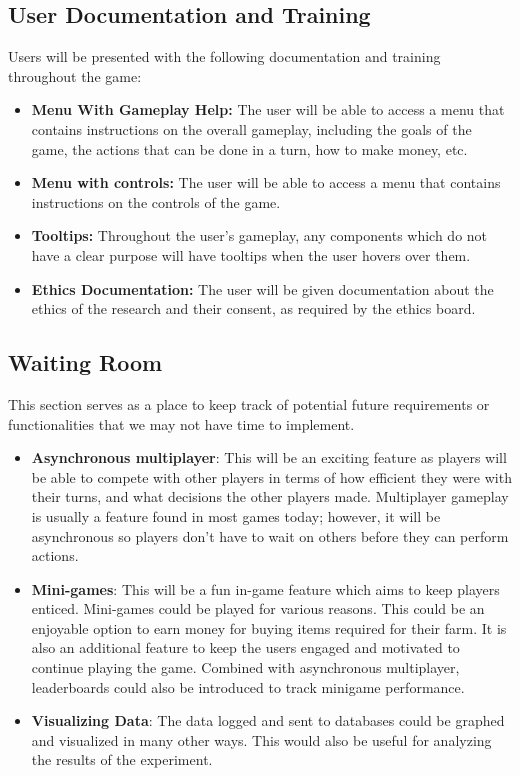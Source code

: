 \documentclass{article}
\begin{document}
\subsection{User Documentation and Training}
Users will be presented with the following documentation and training throughout the game:
\begin{itemize}
    \item \textbf{Menu With Gameplay Help:} The user will be able to access a menu that contains instructions on the overall gameplay, including the goals of the game, the actions that can be done in a turn, how to make money, etc.
    
    \item \textbf{Menu with controls:} The user will be able to access a menu that contains instructions on the controls of the game.
    
    \item \textbf{Tooltips:} Throughout the user's gameplay, any components which do not have a clear purpose will have tooltips when the user hovers over them.
    
    \item \textbf{Ethics Documentation:} The user will be given documentation about the ethics of the research and their consent, as required by the ethics board.
\end{itemize}

\subsection{Waiting Room}
This section serves as a place to keep track of potential future requirements or functionalities that we may not have time to implement.
\begin{itemize}
    
    \item \textbf{Asynchronous multiplayer}: This will be an exciting feature as players will be able to compete with other players in terms of how efficient they were with their turns, and what decisions the other players made. Multiplayer gameplay is usually a feature found in most games today; however, it will be asynchronous so players don't have to wait on others before they can perform actions.
    
    \item \textbf{Mini-games}: This will be a fun in-game feature which aims to keep players enticed. Mini-games could be played for various reasons. This could be an enjoyable option to earn money for buying items required for their farm. It is also an additional feature to keep the users engaged and motivated to continue playing the game. Combined with asynchronous multiplayer, leaderboards could also be introduced to track minigame performance.
    
    \item \textbf{Visualizing Data}: The data logged and sent to databases could be graphed and visualized in many other ways. This would also be useful for analyzing the results of the experiment.
 
\end{itemize}
\end{document}
